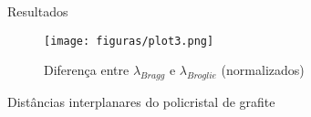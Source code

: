 \begin{frame}{Resultados}

        \begin{center}
        \begin{figure}
        \caption{Diferença entre $\lambda_{Bragg}$ e $\lambda_{Broglie}$ (normalizados)}
        \vspace*{-0.25cm}
        \texttt{[image: figuras/plot3.png]}\par
        \end{figure}
        \end{center}
    
\end{frame}

\begin{frame}{Distâncias
interplanares do policristal de grafite}

    \begin{table}[h!]
    \centering
    \caption{Valores $d$ (distâncias
interplanares) em ångströms (\AA)}
    \end{table}
    


\end{frame}

